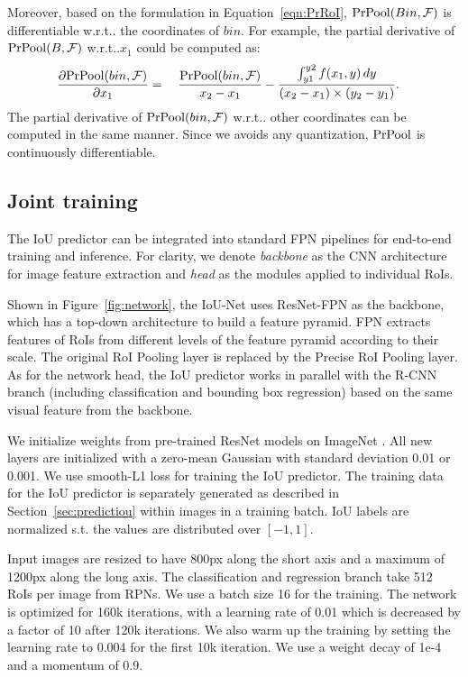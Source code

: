 \documentclass[runningheads]{llncs}
\makeatletter
\DeclareRobustCommand\onedot{\futurelet\@let@token\@onedot}
\def\@onedot{\ifx\@let@token.\else.\null\fi\xspace}
\def\wrt{w.r.t\onedot} \def\dof{d.o.f\onedot}
\makeatother
\begin{document}
Moreover, based on the formulation in Equation~\ref{eqn:PrRoI},  $\mathrm{PrPool}(Bin,\mathcal{F})$ is differentiable \wrt the coordinates of $bin$. For example, the partial derivative of $\mathrm{PrPool}(B,\mathcal{F})$ \wrt $x_1$  could be computed as:
\begin{align}
\frac{\partial \prpool(bin,\mathcal{F})}{\partial x_1} &= \ \ \ \frac{\prpool(bin,\mathcal{F})}{x_2-x_1} - \frac{\int_{y1}^{y2}f(x_1,y)\,dy}{(x_2-x_1) \times (y_2-y_1)}.
\label{eqn:backpro}
\end{align}
The partial derivative of $\mathrm{PrPool}(bin,\mathcal{F})$ \wrt other coordinates can be computed in the same manner. Since we avoids any quantization, $\mathrm{PrPool}$ is continuously differentiable.
 \subsection{Joint training}
\label{sec:joint}
The IoU predictor can be integrated into standard FPN pipelines for end-to-end training and inference. For clarity, we denote \emph{backbone} as the CNN architecture for image feature extraction and \emph{head} as the modules applied to individual RoIs.

Shown in Figure~\ref{fig:network}, the IoU-Net uses ResNet-FPN \cite{Lin_2017_CVPR} as the backbone, which has a top-down architecture to build a feature pyramid. FPN extracts features of RoIs from different levels of the feature pyramid according to their scale. The original RoI Pooling layer is replaced by the Precise RoI Pooling layer. As for the network head, the IoU predictor works in parallel with the R-CNN branch (including classification and bounding box regression) based on the same visual feature from the backbone.


We initialize weights from pre-trained ResNet models on ImageNet \cite{ILSVRC15}. All new layers are initialized with a zero-mean Gaussian with standard deviation 0.01 or 0.001. We use smooth-L1 loss for training the IoU predictor. The training data for the IoU predictor is separately generated as described in Section~\ref{sec:predictiou} within images in a training batch. IoU labels are normalized s.t. the values are distributed over $[-1, 1]$.

Input images are resized to have 800px along the short axis and a maximum of 1200px along the long axis. The classification and regression branch take 512 RoIs per image from RPNs. We use a batch size 16 for the training. The network is optimized for 160k iterations, with a learning rate of 0.01 which is decreased by a factor of 10 after 120k iterations. We also warm up the training by setting the learning rate to 0.004 for the first 10k iteration. We use a weight decay of 1e-4 and a momentum of 0.9.
\end{document}
